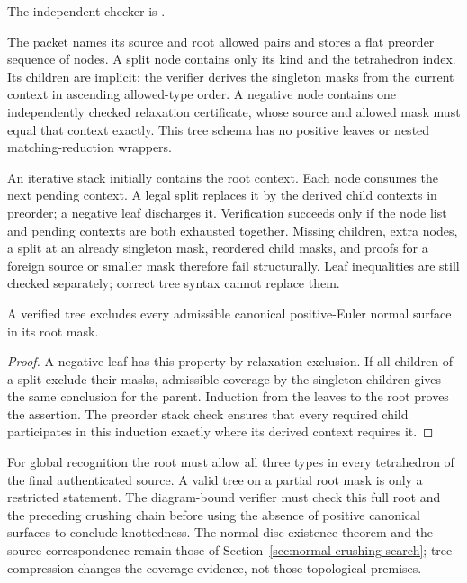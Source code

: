 The independent checker is
.

The  packet names its source and root
allowed pairs and stores a flat preorder sequence of nodes.  A split node
contains only its kind and the tetrahedron index.  Its children are implicit:
the verifier derives the singleton masks from the current context in
ascending allowed-type order.  A negative node contains one independently
checked relaxation certificate, whose source and allowed mask must equal
that context exactly.  This tree schema has no positive leaves or nested
matching-reduction wrappers.

An iterative stack initially contains the root context.  Each node consumes
the next pending context.  A legal split replaces it by the derived child
contexts in preorder; a negative leaf discharges it.  Verification succeeds
only if the node list and pending contexts are both exhausted together.
Missing children, extra nodes, a split at an already singleton mask,
reordered child masks, and proofs for a foreign source or smaller mask
therefore fail structurally.  Leaf inequalities are still checked separately;
correct tree syntax cannot replace them.

\begin{proposition}
A verified tree excludes every admissible canonical positive-Euler normal
surface in its root mask.
\end{proposition}
\begin{proof}
A negative leaf has this property by relaxation exclusion.  If all children
of a split exclude their masks, admissible coverage by the singleton
children gives the same conclusion for the parent.  Induction from the
leaves to the root proves the assertion.  The preorder stack check ensures
that every required child participates in this induction exactly where its
derived context requires it.
\end{proof}

For global recognition the root must allow all three types in every
tetrahedron of the final authenticated source.  A valid tree on a partial
root mask is only a restricted statement.  The diagram-bound verifier must
check this full root and the preceding crushing chain before using the
absence of positive canonical surfaces to conclude knottedness.  The normal
disc existence theorem and the source correspondence remain those of
Section~\ref{sec:normal-crushing-search}; tree compression changes the
coverage evidence, not those topological premises.

